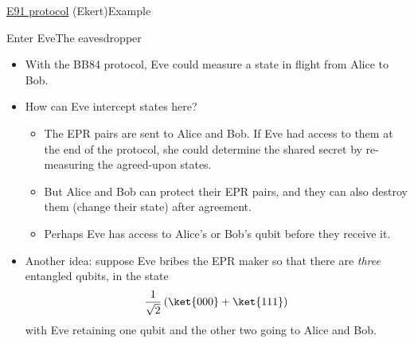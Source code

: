 {\begin{frame}{\href{https://en.wikipedia.org/wiki/Quantum_key_distribution\#E91_protocol:_Artur_Ekert_(1991)}{E91 protocol} (Ekert)}{Example}
\begin{EKey}
\end{EKey}

\end{frame}}

\begin{frame}{Enter Eve}{The eavesdropper}
\begin{itemize}[<+->]
    \item With the BB84 protocol, Eve could measure a state in flight from Alice to Bob.
    \item How can Eve intercept states here?
    \begin{itemize}
        \item The EPR pairs are sent to Alice and Bob.  If Eve had access to them at the end of the protocol, she could determine the shared secret by re-measuring the agreed-upon states.
        \item But Alice and Bob can protect their EPR pairs, and they can also destroy them (change their state) after agreement.
        \item Perhaps Eve has access to Alice's or Bob's qubit before they receive it.
    \end{itemize}
    \item Another idea:  suppose Eve bribes the EPR maker so that there are \emph{three} entangled qubits, in the state
    \[ \RootTwo{}\left(\ket{000}+\ket{111}\right) \]
    with Eve retaining one qubit and the other two going to Alice and Bob.
\end{itemize}
\end{frame}


